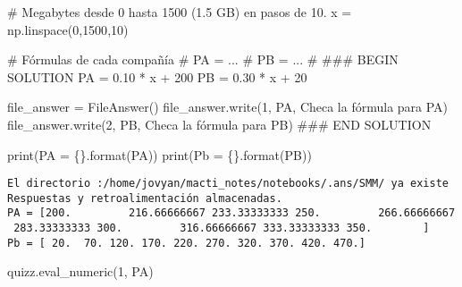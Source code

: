 \documentclass[
  letterpaper,
  DIV=11,
  numbers=noendperiod]{scrreprt}
\newenvironment{Shaded}{\begin{snugshade}}{\end{snugshade}}
\newcommand{\BuiltInTok}[1]{\textcolor[rgb]{0.00,0.23,0.31}{#1}}
\newcommand{\CommentTok}[1]{\textcolor[rgb]{0.37,0.37,0.37}{#1}}
\newcommand{\DecValTok}[1]{\textcolor[rgb]{0.68,0.00,0.00}{#1}}
\newcommand{\FloatTok}[1]{\textcolor[rgb]{0.68,0.00,0.00}{#1}}
\newcommand{\NormalTok}[1]{\textcolor[rgb]{0.00,0.23,0.31}{#1}}
\newcommand{\OperatorTok}[1]{\textcolor[rgb]{0.37,0.37,0.37}{#1}}
\newcommand{\RegionMarkerTok}[1]{\textcolor[rgb]{0.00,0.23,0.31}{#1}}
\newcommand{\SpecialCharTok}[1]{\textcolor[rgb]{0.37,0.37,0.37}{#1}}
\newcommand{\StringTok}[1]{\textcolor[rgb]{0.13,0.47,0.30}{#1}}
\begin{document}
\begin{Shaded}
\begin{Highlighting}[]
\CommentTok{\# Megabytes desde 0 hasta 1500 (1.5 GB) en pasos de 10.}
\NormalTok{x }\OperatorTok{=}\NormalTok{ np.linspace(}\DecValTok{0}\NormalTok{,}\DecValTok{1500}\NormalTok{,}\DecValTok{10}\NormalTok{)}

\CommentTok{\# Fórmulas de cada compañía}
\CommentTok{\# PA = ...}
\CommentTok{\# PB = ...}
\CommentTok{\#}
\CommentTok{\#\#\# }\RegionMarkerTok{BEGIN}\CommentTok{ SOLUTION}
\NormalTok{PA }\OperatorTok{=} \FloatTok{0.10} \OperatorTok{*}\NormalTok{ x }\OperatorTok{+} \DecValTok{200}
\NormalTok{PB }\OperatorTok{=} \FloatTok{0.30} \OperatorTok{*}\NormalTok{ x }\OperatorTok{+} \DecValTok{20}

\NormalTok{file\_answer }\OperatorTok{=}\NormalTok{ FileAnswer()}
\NormalTok{file\_answer.write(}\StringTok{\textquotesingle{}1\textquotesingle{}}\NormalTok{, PA, }\StringTok{\textquotesingle{}Checa la fórmula para PA\textquotesingle{}}\NormalTok{)}
\NormalTok{file\_answer.write(}\StringTok{\textquotesingle{}2\textquotesingle{}}\NormalTok{, PB, }\StringTok{\textquotesingle{}Checa la fórmula para PB\textquotesingle{}}\NormalTok{)}
\CommentTok{\#\#\# }\RegionMarkerTok{END}\CommentTok{ SOLUTION}

\BuiltInTok{print}\NormalTok{(}\StringTok{\textquotesingle{}PA = }\SpecialCharTok{\{\}}\StringTok{\textquotesingle{}}\NormalTok{.}\BuiltInTok{format}\NormalTok{(PA))}
\BuiltInTok{print}\NormalTok{(}\StringTok{\textquotesingle{}Pb = }\SpecialCharTok{\{\}}\StringTok{\textquotesingle{}}\NormalTok{.}\BuiltInTok{format}\NormalTok{(PB))}
\end{Highlighting}
\end{Shaded}

\begin{verbatim}
El directorio :/home/jovyan/macti_notes/notebooks/.ans/SMM/ ya existe
Respuestas y retroalimentación almacenadas.
PA = [200.         216.66666667 233.33333333 250.         266.66666667
 283.33333333 300.         316.66666667 333.33333333 350.        ]
Pb = [ 20.  70. 120. 170. 220. 270. 320. 370. 420. 470.]
\end{verbatim}

\begin{Shaded}
\begin{Highlighting}[]
\NormalTok{quizz.eval\_numeric(}\StringTok{\textquotesingle{}1\textquotesingle{}}\NormalTok{, PA)}
\end{Highlighting}
\end{Shaded}
\end{document}

